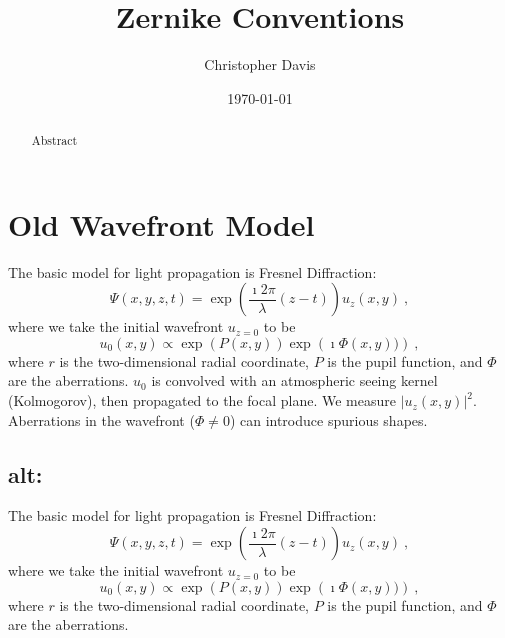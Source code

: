 \documentclass[aas_macros,preprint]{aastex}%
\renewcommand{\exp}[1]{\operatorname{exp}\left(#1\right)} %
\begin{document}
\title{ Zernike Conventions }
\author{ Christopher Davis }
\affil{}
\email{}
\date{ \today }

\maketitle

\begin{abstract}
  Abstract
\end{abstract}

\tableofcontents






\section{Old Wavefront Model}

  The basic model for light propagation is Fresnel Diffraction:
  \begin{equation}
    \Psi(x, y, z, t) = \exp{\frac{\imath 2 \pi}{\lambda} (z - t)}
    u_z(x, y) \ ,
  \end{equation}
  where we take the initial wavefront $u_{z=0}$ to be
  \begin{equation}
    u_0(x,y) \propto \exp{P(x, y)} \exp{\imath \Phi(x, y))} \ ,
  \end{equation}
  where $r$ is the two-dimensional radial coordinate, $P$ is the pupil
  function, and $\Phi$ are the aberrations. $u_0$ is convolved with an
  atmospheric seeing kernel (Kolmogorov), then propagated to the focal plane.
  We measure $| u_z(x,y)|^2$. Aberrations in the wavefront ($\Phi \neq 0$)
  can introduce spurious shapes.


  \subsection{alt:}


The basic model for light propagation is Fresnel Diffraction:
\begin{equation}
  \Psi(x, y, z, t) = \exp{\frac{\imath 2 \pi}{\lambda} (z - t)}
  u_z(x, y) \ ,
\end{equation}
where we take the initial wavefront $u_{z=0}$ to be
\begin{equation}
  u_0(x,y) \propto \exp{P(x, y)} \exp{\imath \Phi(x, y))} \ ,
\end{equation}
where $r$ is the two-dimensional radial coordinate, $P$ is the pupil
function, and $\Phi$ are the aberrations.
\end{document}
